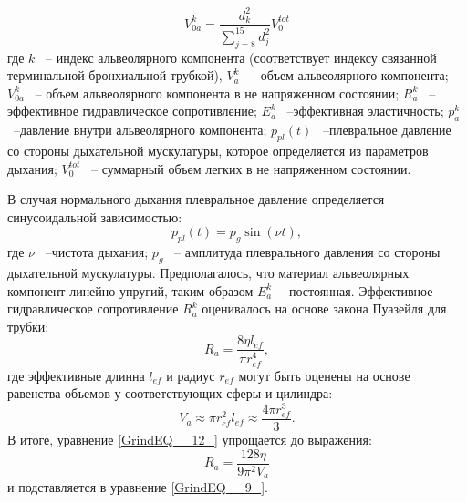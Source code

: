\begin{equation} 
\label{GrindEQ__91_}
V_{0a}^{k} = \frac{d_{k}^{2}}{\sum_{j=8}^{15} d^{2}_{j}}V_{0}^{tot} 
\end{equation} 
где $k$ ~-- индекс альвеолярного компонента (соответствует индексу связанной терминальной бронхиальной трубкой), $V_{a}^{k} $ ~-- объем альвеолярного компонента; $V_{0a}^{k} $ ~-- объем альвеолярного компонента в не напряженном состоянии; $R_{a}^{k} $ ~-- эффективное гидравлическое сопротивление; $E_{a}^{k} $ ~--эффективная эластичность; $p_{a}^{k} $ ~--давление внутри альвеолярного компонента; $p_{pl} \left(t\right)$ ~--плевральное давление со стороны дыхательной мускулатуры, которое определяется из параметров дыхания; $V_{0}^{tot} $ ~-- суммарный объем легких в не напряженном состоянии. 

В случая нормального дыхания плевральное давление определяется синусоидальной зависимостью:
\begin{equation} \label{GrindEQ__10_} 
p_{pl} \left(t\right)=p_{g} \sin \left(\nu t\right), 
\end{equation} 
где $\nu $ ~--чистота дыхания; $p_{g} $ ~-- амплитуда плеврального давления со стороны дыхательной мускулатуры. Предполагалось, что материал альвеолярных компонент линейно-упругий, таким образом $E_{a}^{k} $ ~--постоянная. Эффективное гидравлическое сопротивление $R_{a}^{k} $ оценивалось на основе закона Пуазейля для трубки:
\begin{equation} \label{GrindEQ__11_} 
R_{a} =\frac{8\eta l_{ef} }{\pi r_{ef}^{4} } ,  
\end{equation} 
где  эффективные длинна $l_{ef} $ и радиус $r_{ef} $ могут быть оценены на основе равенства объемов у соответствующих сферы и цилиндра:
\begin{equation} \label{GrindEQ__12_} 
V_{a} \approx \pi r_{ef}^{2} l_{ef} \approx \frac{4\pi r_{ef}^{3} }{3} .  
\end{equation} 
В итоге, уравнение \eqref{GrindEQ__12_} упрощается до выражения:
\begin{equation} \label{GrindEQ__13_} 
R_{a} =\frac{128\eta }{9\pi ^{2} V_{a} }  
\end{equation} 
и подставляется в уравнение \eqref{GrindEQ__9_}.

